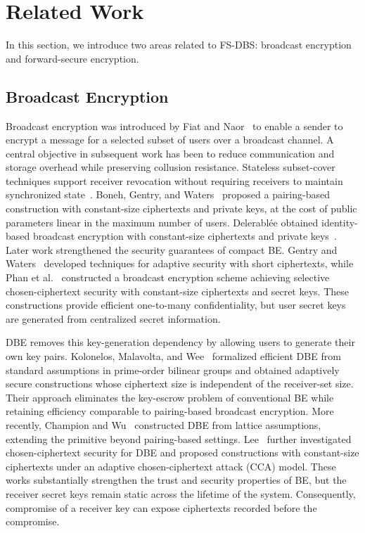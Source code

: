 \documentclass[sigconf,anonymous]{acmart}
\theoremstyle{definition}
\theoremstyle{definition}
\theoremstyle{definition}
\theoremstyle{definition}
\theoremstyle{definition}
\theoremstyle{definition}
\theoremstyle{definition}
\theoremstyle{definition}
\theoremstyle{definition}
\begin{document}
\section{Related Work}

In this section, we introduce two areas related to FS-DBS: broadcast encryption and forward-secure encryption.
\subsection{Broadcast Encryption}
Broadcast encryption was introduced by Fiat and Naor~\cite{FiatNaor1993} to enable a sender to encrypt a message for a selected subset of users over a broadcast channel. A central objective in subsequent work has been to reduce communication and storage overhead while preserving collusion resistance. Stateless subset-cover techniques support receiver revocation without requiring receivers to maintain synchronized state~\cite{naor2001revocation}. Boneh, Gentry, and Waters~\cite{BGW05} proposed a pairing-based construction with constant-size ciphertexts and private keys, at the cost of public parameters linear in the maximum number of users. Delerabl\'ee obtained identity-based broadcast encryption with constant-size ciphertexts and private keys~\cite{delerablee2007ibbe}. Later work strengthened the security guarantees of compact BE. Gentry and Waters~\cite{gentry2009adaptive} developed techniques for adaptive security with short ciphertexts, while Phan et al.~\cite{phan2012cca} constructed a broadcast encryption scheme achieving selective chosen-ciphertext security with constant-size ciphertexts and secret keys. These constructions provide efficient one-to-many confidentiality, but user secret keys are generated from centralized secret information.

DBE removes this key-generation dependency by allowing users to generate their own key pairs. Kolonelos, Malavolta, and Wee~\cite{kolonelos2023distributed} formalized efficient DBE from standard assumptions in prime-order bilinear groups and obtained adaptively secure constructions whose ciphertext size is independent of the receiver-set size. Their approach eliminates the key-escrow problem of conventional BE while retaining efficiency comparable to pairing-based broadcast encryption. More recently, Champion and Wu~\cite{champion2024distributed} constructed DBE from lattice assumptions, extending the primitive beyond pairing-based settings. Lee~\cite{lee2025cca} further investigated chosen-ciphertext security for DBE and proposed constructions with constant-size ciphertexts under an adaptive chosen-ciphertext attack (CCA) model. These works substantially strengthen the trust and security properties of BE, but the receiver secret keys remain static across the lifetime of the system. Consequently, compromise of a receiver key can expose ciphertexts recorded before the compromise.
\end{document}
